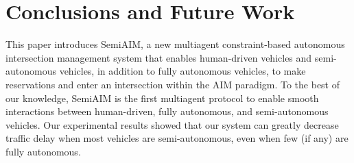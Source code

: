\section{Conclusions and Future Work}
\label{sec:conclusions}

This paper introduces SemiAIM, a new multiagent constraint-based
autonomous intersection management system that enables human-driven
vehicles and semi-autonomous vehicles, in addition to fully autonomous
vehicles, to make reservations and enter an intersection within the
AIM paradigm.  To the best of our knowledge, SemiAIM is the first
multiagent protocol to enable smooth interactions between
human-driven, fully autonomous, and semi-autonomous vehicles.  Our
experimental results showed that our system can greatly decrease
traffic delay when most vehicles are semi-autonomous, even when few
(if any) are fully autonomous.











